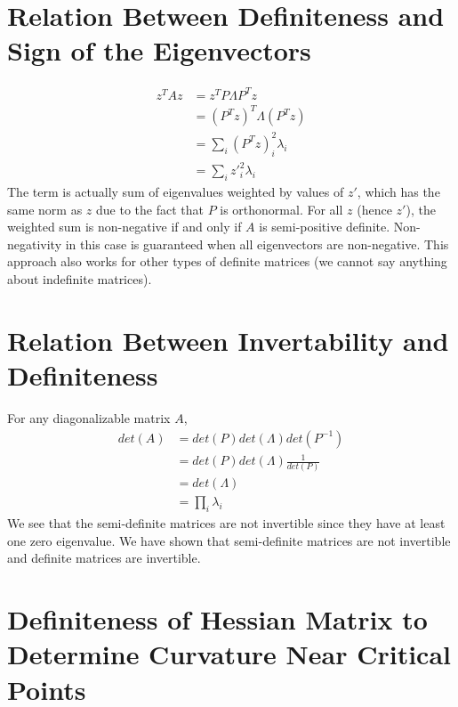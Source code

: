 \documentclass{book}
\numberwithin{equation}{subsection}
\begin{document}
\section{Relation Between Definiteness and Sign of the Eigenvectors}
\begin{align}
    z^TAz &= z^TP\Lambda P^Tz\\
    &= (P^Tz)^T\Lambda (P^Tz)\\
    &= \sum_i (P^Tz)_i^2 \lambda_i\\
    &= \sum_i z'_i^2 \lambda_i
\end{align}
The term is actually sum of eigenvalues weighted by values of $z'$, which has the same norm as $z$ due to the fact that $P$ is orthonormal. For all $z$ (hence $z'$), the weighted sum is non-negative if and only if $A$ is semi-positive definite. Non-negativity in this case is guaranteed when all eigenvectors are non-negative. This approach also works for other types of definite matrices (we cannot say anything about indefinite matrices). 
\section{Relation Between Invertability and Definiteness}
For any diagonalizable matrix $A$, 
\begin{align}
    det(A) &= det(P) det(\Lambda) det(P^{-1})\\
    &= det(P) det(\Lambda) \frac{1}{det(P)}\\
    &= det(\Lambda)\\
    &= \prod_i \lambda_i
\end{align}
We see that the semi-definite matrices are not invertible since they have at least one zero eigenvalue. We have shown that semi-definite matrices are not invertible and definite matrices are invertible.
\section{Definiteness of Hessian Matrix to Determine Curvature Near Critical Points}
\end{document}
